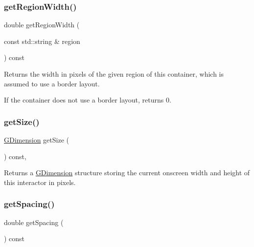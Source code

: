 \subsubsection{\texorpdfstring{get\+Region\+Width()}{getRegionWidth()}\hspace{0.1cm}{\footnotesize\ttfamily [2/2]}}
{\footnotesize\ttfamily double get\+Region\+Width (\begin{DoxyParamCaption}\item[{const std\+::string \&}]{region }\end{DoxyParamCaption}) const\hspace{0.3cm}{\ttfamily [virtual]}}



Returns the width in pixels of the given region of this container, which is assumed to use a border layout. 

If the container does not use a border layout, returns 0. \mbox{\label{classsgl_1_1GInteractor_a7b4eec96a2bdc6420695d5796a78eea9}} 
\subsubsection{\texorpdfstring{get\+Size()}{getSize()}}
{\footnotesize\ttfamily \mbox{\hyperlink{structsgl_1_1GDimension}{G\+Dimension}} get\+Size (\begin{DoxyParamCaption}{ }\end{DoxyParamCaption}) const\hspace{0.3cm}{\ttfamily [virtual]}, {\ttfamily [inherited]}}



Returns a \mbox{\hyperlink{structsgl_1_1GDimension}{G\+Dimension}} structure storing the current onscreen width and height of this interactor in pixels. 

\mbox{\label{classsgl_1_1GContainer_a9a7e859eeff5cc7de46d65b9be7afc3c}} 
\subsubsection{\texorpdfstring{get\+Spacing()}{getSpacing()}}
{\footnotesize\ttfamily double get\+Spacing (\begin{DoxyParamCaption}{ }\end{DoxyParamCaption}) const\hspace{0.3cm}{\ttfamily [virtual]}}




